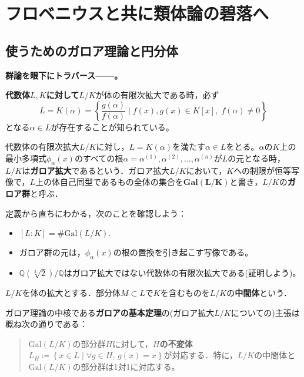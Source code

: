 \section{フロベニウスと共に類体論の碧落へ}\label{hekiraku}
\subsection{使うためのガロア理論と円分体}
\textbf{群論を眼下にトラバース------。}

\vspace{10pt}

\textbf{代数体$L,K$に対して}$L/K$が体の有限次拡大である時，必ず\[
L=K(\alpha)=\left\{\frac{g(\alpha)}{f(\alpha)}\mid f(x),g(x)\in K[x],\; f(\alpha)\ne 0\right\}
\]となる$\alpha\in L$が存在することが知られている。
\begin{dfn}
    代数体の有限次拡大$L/K$に対し，$L=K(\alpha)$を満たす$\alpha\in L$をとる。$\alpha$の$K$上の最小多項式$\phi_{\alpha}(x)$のすべての根$\alpha=\alpha^{(1)},\alpha^{(2)},\ldots,\alpha^{(n)}$が$L$の元となる時，$L/K$は\textbf{ガロア拡大}であるという．ガロア拡大$L/K$において，$K$への制限が恒等写像で，$L$上の体自己同型であるもの全体の集合を$\boldsymbol{\textrm{Gal}(L/K)}$と書き，$L/K$の\textbf{ガロア群}と呼ぶ．
\end{dfn}

定義から直ちにわかる，次のことを確認しよう：
\begin{itemize}
    \item $[L:K]=\#\textrm{Gal}(L/K).$
    \item ガロア群の元は，$\phi_{\alpha}(x)$の根の置換を引き起こす写像である。
    \item $\mathbb{Q}(\sqrt[3]{2})/{\mathbb{Q}}$はガロア拡大ではない代数体の有限次拡大である(証明しよう)。
\end{itemize}

\begin{dfn}[中間体]
    $L/K$を体の拡大とする．部分体$M\subset L$で$K$を含むものを$L/K$の\textbf{中間体}という．
\end{dfn}

ガロア理論の中核である\textbf{ガロアの基本定理}の(ガロア拡大$L/K$についての)主張は概ね次の通りである：
\begin{quote}
    $\textrm{Gal}(L/K)$の部分群$H$に対して，\textbf{$H$の不変体}$L_H\coloneqq\left\{x\in L\mid\forall g\in H,\, g(x)=x\right\}$が対応する．特に，$L/K$の中間体と$\mathrm{Gal}(L/K)$の部分群は1対1に対応する。
\end{quote}

